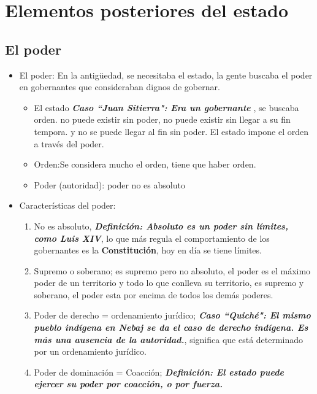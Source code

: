\section{Elementos posteriores del estado}

\subsection{El poder}
\begin{itemize}
    \item El poder: En la antigüedad, se necesitaba el estado, la gente buscaba el poder en gobernantes que consideraban dignos de gobernar. 
    \begin{itemize}
        \item El estado \textbf{\emph{Caso ``Juan Sitierra": Era un gobernante }}, se buscaba orden. no puede existir sin poder, no puede existir sin llegar a su fin tempora. y no se puede llegar al fin sin poder. El estado impone el orden a través del poder.
        \item Orden:Se considera mucho el orden, tiene que haber orden.
        \item Poder (autoridad): poder no es absoluto
    \end{itemize}


    \item Características del poder:
    \begin{enumerate}
        \item No es absoluto, \textbf{\emph{Definición: Absoluto es un poder sin límites, como Luis XIV}}, lo que más regula el comportamiento de los gobernantes es la \textbf{Constitución}, hoy en día se tiene límites.
        
        \item Supremo o soberano; es supremo pero no absoluto, el poder es el máximo poder de un territorio y todo lo que conlleva su territorio, es supremo y soberano, el poder esta por encima de todos los demás poderes.
        
        \item Poder de derecho = ordenamiento jurídico; \textbf{\emph{Caso ``Quiché": El mismo pueblo indígena en Nebaj se da el caso de derecho indígena. Es más una ausencia de la autoridad.}}, significa que está determinado por un ordenamiento jurídico.
        
        \item Poder de dominación = Coacción; \textbf{\emph{Definición:  El estado puede ejercer su poder por coacción, o por fuerza.}}
    \end{enumerate}


\end{itemize}
